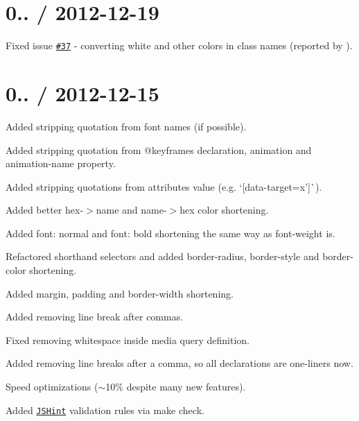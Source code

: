\section*{0.. / 2012-\/12-\/19 }


\begin{DoxyItemize}
\item Fixed issue \href{https://github.com/jakubpawlowicz/clean-css/issues/37}{\tt \#37} -\/ converting {\ttfamily white} and other colors in class names (reported by \href{https://github.com/malgorithms}{\tt }).
\end{DoxyItemize}

\section*{0.. / 2012-\/12-\/15 }


\begin{DoxyItemize}
\item Added stripping quotation from font names (if possible).
\item Added stripping quotation from {\ttfamily @keyframes} declaration, {\ttfamily animation} and {\ttfamily animation-\/name} property.
\item Added stripping quotations from attributes\textquotesingle{} value (e.\+g. `\mbox{[}data-\/target=\textquotesingle{}x'\mbox{]}\`{}).
\item Added better hex-\/$>$name and name-\/$>$hex color shortening.
\item Added {\ttfamily font\+: normal} and {\ttfamily font\+: bold} shortening the same way as {\ttfamily font-\/weight} is.
\item Refactored shorthand selectors and added {\ttfamily border-\/radius}, {\ttfamily border-\/style} and {\ttfamily border-\/color} shortening.
\item Added {\ttfamily margin}, {\ttfamily padding} and {\ttfamily border-\/width} shortening.
\item Added removing line break after commas.
\item Fixed removing whitespace inside media query definition.
\item Added removing line breaks after a comma, so all declarations are one-\/liners now.
\item Speed optimizations ($\sim$10\% despite many new features).
\item Added \href{https://github.com/jshint/jshint/}{\tt J\+S\+Hint} validation rules via {\ttfamily make check}.
\end{DoxyItemize}

